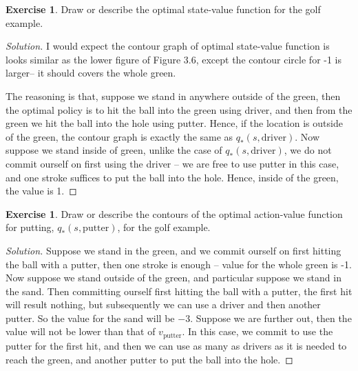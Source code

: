 \documentclass[oneside,11pt]{article}
\theoremstyle{definition}
\newtheorem{exer}[thm]{Exercise}
\newenvironment{solution}
{\renewcommand\qedsymbol{$\blacksquare$}\begin{proof}[Solution]} {\end{proof}}
\begin{document}
\begin{exer}
Draw or describe the optimal state-value function for the golf example.
\end{exer}

\begin{shaded}
\begin{solution} 
I would expect the contour graph of optimal state-value function is looks similar as the lower figure of Figure 3.6, except the contour circle for -1 is larger-- it should covers the whole green. 

The reasoning is that, suppose we stand in anywhere outside of the green, then the optimal policy is to hit the ball into the green using driver, and then from the green we hit the ball into the hole using putter. Hence, if the location is outside of the green, the contour graph is exactly the same as $q_{\ast}(s, \text{driver})$. Now suppose we stand inside of green, unlike the case of $q_{\ast}(s, \text{driver})$, we do not commit ourself on first using the driver -- we are free to use putter in this case, and one stroke suffices to put the ball into the hole. Hence, inside of the green, the value is 1.
\end{solution}
\end{shaded}



\begin{exer}
Draw or describe the contours of the optimal action-value function for putting, $q_{\ast}(s,\text{putter})$, for the golf example.
\end{exer}

\begin{shaded}
\begin{solution} 
Suppose we stand in the green, and we commit ourself on first hitting the ball with a putter, then one stroke is enough -- value for the whole green is -1. Now suppose we stand outside of the green, and particular suppose we stand in the sand. Then committing ourself first hitting the ball with a putter, the first hit will result nothing, but subsequently we can use a driver and then another putter. So the value for the sand will be $-3$. Suppose we are further out, then the value will not be lower than that of $v_{\text{putter}}$. In this case, we commit to use the putter for the first hit, and then we can use as many as drivers as it is needed to reach the green, and another putter to put the ball into the hole.

\end{solution} 
\end{shaded}
\end{document}
